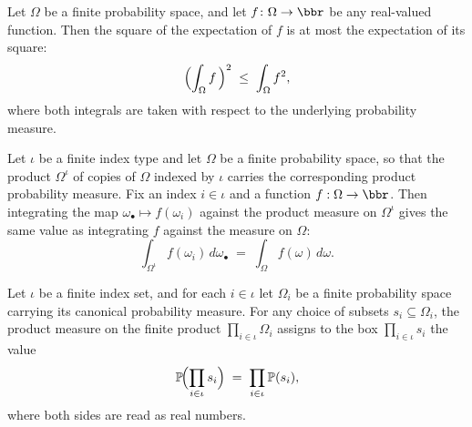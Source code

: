 \begin{theorem}
\label{CommunicationComplexity.FiniteProbabilitySpace.sq_integral_le_integral_sq}
\leanok
{}
Let $\Omega$ be a finite probability space, and let $f\colon\Omega\to\bbr$ be any
real-valued function. Then the square of the expectation of $f$ is at most the
expectation of its square:
\[
  \Bigl(\int_\Omega f\,\Bigr)^2 \;\le\; \int_\Omega f^2,
\]
where both integrals are taken with respect to the underlying probability measure.
\end{theorem}

\begin{theorem}
\label{CommunicationComplexity.FiniteProbabilitySpace.integral_comp_eval}
\leanok
{}
Let $\iota$ be a finite index type and let $\Omega$ be a finite probability space, so
that the product $\Omega^{\iota}$ of copies of $\Omega$ indexed by $\iota$ carries the
corresponding product probability measure. Fix an index $i \in \iota$ and a function $f
: \Omega \to \bbr$. Then integrating the map $\omega_{\bullet} \mapsto f(\omega_i)$
against the product measure on $\Omega^{\iota}$ gives the same value as integrating $f$
against the measure on $\Omega$:
\[
\int_{\Omega^{\iota}} f(\omega_i) \, d\omega_{\bullet} \;=\; \int_{\Omega} f(\omega)\,
d\omega.
\]
\end{theorem}

\begin{theorem}
\label{CommunicationComplexity.FiniteProbabilitySpace.measureReal_pi_univ}
\leanok
{}
Let $\iota$ be a finite index set, and for each $i \in \iota$ let $\Omega_i$ be a finite
probability space carrying its canonical probability measure. For any choice of subsets
$s_i \subseteq \Omega_i$, the product measure on the finite product $\prod_{i \in \iota}
\Omega_i$ assigns to the box $\prod_{i \in \iota} s_i$ the value
\[
\mathbb{P}\!\Bigl(\prod_{i \in \iota} s_i\Bigr) \;=\; \prod_{i \in \iota}
\mathbb{P}(s_i),
\]
where both sides are read as real numbers.
\end{theorem}

